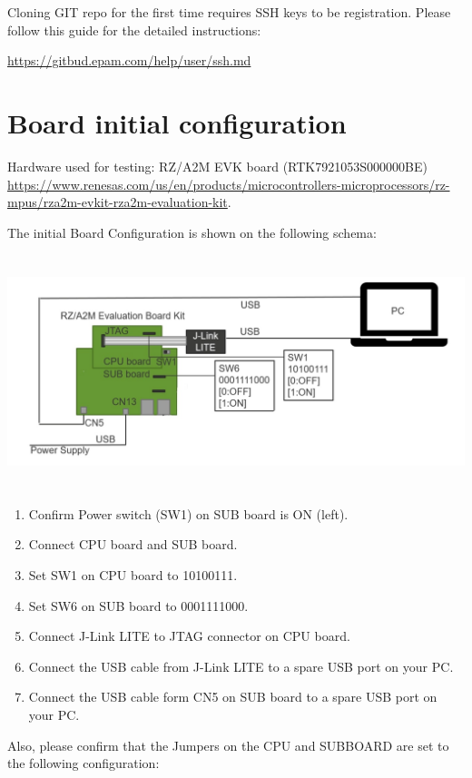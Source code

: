 \documentclass[11pt,a4paper,oneside]{article}
\begin{document}
Cloning GIT repo for the first time requires SSH keys to be
registration. Please follow this guide for the detailed instructions:

\url{https://gitbud.epam.com/help/user/ssh.md}

\section{Board initial configuration}\label{board-initial-configuration}

Hardware used for testing: RZ/A2M EVK board (RTK7921053S000000BE)
\url{https://www.renesas.com/us/en/products/microcontrollers-microprocessors/rz-mpus/rza2m-evkit-rza2m-evaluation-kit}.

The initial Board Configuration is shown on the following schema:

\includegraphics[width=6.66667in,height=2.6875in]{./media/image4.jpg}

\begin{enumerate}
\def\labelenumi{\arabic{enumi}.}
\item
  Confirm Power switch (SW1) on SUB board is ON (left).
\item
  Connect CPU board and SUB board.
\item
  Set SW1 on CPU board to 10100111.
\item
  Set SW6 on SUB board to 0001111000.
\item
  Connect J-Link LITE to JTAG connector on CPU board.
\item
  Connect the USB cable from J-Link LITE to a spare USB port on your PC.
\item
  Connect the USB cable form CN5 on SUB board to a spare USB port on
  your PC.
\end{enumerate}

Also, please confirm that the Jumpers on the CPU and SUBBOARD are set to
the following configuration:
\end{document}
